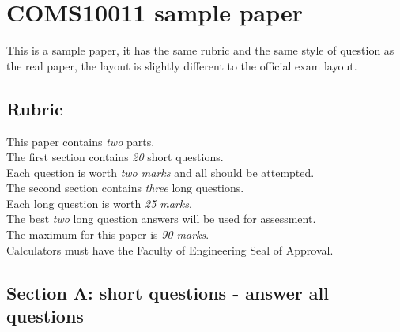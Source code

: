 \documentclass{article}
\begin{document}
\section*{COMS10011 sample paper}

This is a sample paper, it has the same rubric and the same style of
question as the real paper, the layout is slightly different to the
official exam layout. 

\subsection*{Rubric}{
This paper contains \emph{two} parts. \\
The first section contains \emph {20} short questions.\\ 
Each question is worth \emph{two marks} and all should be attempted.\\
The second section contains \emph {three} long questions.\\
Each long question is worth \emph{25 marks}.\\
The best \emph{two} long question answers will be used for assessment. \\
The maximum for this paper is \emph{90 marks}. \\
Calculators must have the Faculty of Engineering Seal of Approval.}


\subsection*{Section A: short questions - answer all questions}
\end{document}
